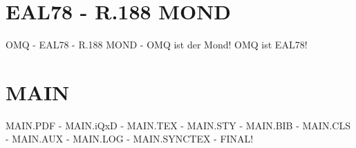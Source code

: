 \documentclass{MAIN}
\begin{document}
\maketitle
\section*{EAL78 - R.188 MOND}
OMQ - EAL78 - R.188 MOND - OMQ ist der Mond! OMQ ist EAL78!
\section*{MAIN}
MAIN.PDF - MAIN.iQxD - MAIN.TEX - MAIN.STY - MAIN.BIB - MAIN.CLS - MAIN.AUX - MAIN.LOG - MAIN.SYNCTEX - FINAL!
\cite{omq_eal78}

\end{document}
